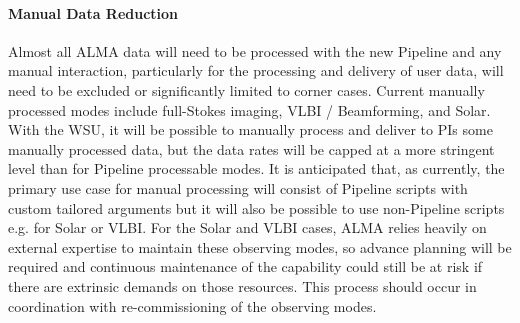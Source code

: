 




\paragraph{Manual Data Reduction}

Almost all ALMA data will need to be processed with the new Pipeline and any manual interaction, particularly for the processing and delivery of user data, will need to be excluded or significantly limited to corner cases. Current manually processed modes include full-Stokes imaging, VLBI / Beamforming, and Solar. With the WSU, it will be possible to manually process and deliver to PIs some manually processed data, but the data rates will be capped at a more stringent level than for Pipeline processable modes. It is anticipated that, as currently, the primary use case for manual processing will consist of Pipeline scripts with custom tailored arguments but it will also be possible to use non-Pipeline scripts e.g. for Solar or VLBI. For the Solar and VLBI cases, ALMA relies heavily on external expertise to maintain these observing modes, so advance planning will be required and continuous maintenance of the capability could still be at risk if there are extrinsic demands on those resources. This process should occur in coordination with re-commissioning of the observing modes.


